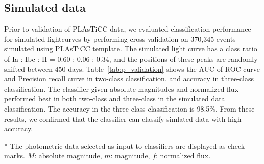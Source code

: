 \documentclass[useamsfonts]{pasj01}
\begin{document}
\subsection{Simulated data}
%
Prior to validation of PLAsTiCC data, we evaluated classification performance for simulated lightcurves by performing cross-validation on 370,345 events simulated using PLAsTiCC template.
The simulated light curve has a class ratio of Ia : Ibc : II = 0.60 : 0.06 : 0.34, and the positions of these peaks are randomly shifted between 450 days.
Table\ \ref{tab:p_validation} shows the AUC of ROC curve and Precision recall curve in two-class classification, and accuracy in three-class classification.
The classifier given absolute magnitudes and normalized flux performed best in both two-class and three-class in the simulated data classification.
The accuracy in the three-class classification is 98.5\%.
From these results, we confirmed that the classifier can classify simlated data with high accuracy.
%
%
%
%
\begin{table}[ht]
\label{tab:p_validation}
\begin{tabnote}
* The photometric data selected as input to classifiers are displayed as check marks.
$M$: absolute magnitude, $m$: magnitude, $f$: normalized flux.
\end{tabnote}
\end{table}
%
%
\end{document}
